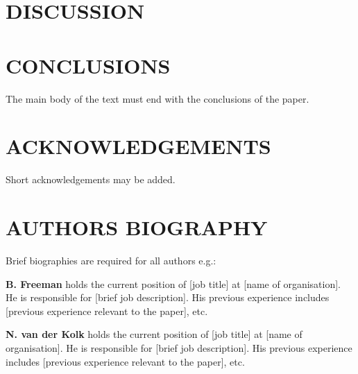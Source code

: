 \documentclass[10pt,a4paper,twocolumn]{article}
\begin{document}
\section{DISCUSSION}




\section{CONCLUSIONS}

The main body of the text must end with the conclusions of the paper.

\section{ACKNOWLEDGEMENTS}

Short acknowledgements may be added.




\section{AUTHORS BIOGRAPHY}

Brief biographies are required for all authors e.g.:

\textbf{B. Freeman} holds the current position of [job title] at [name of organisation].  He is responsible for [brief job description].  His previous experience includes [previous experience relevant to the paper], etc.

\textbf{N. van der Kolk} holds the current position of [job title] at [name of organisation].  He is responsible for [brief job description].  His previous experience includes [previous experience relevant to the paper], etc.

\end{document}

